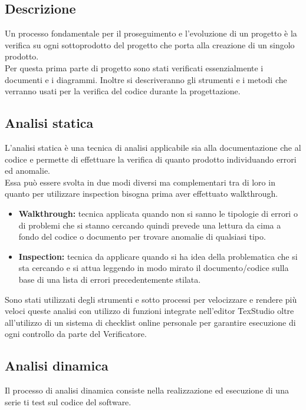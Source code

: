 \documentclass[NormeDiProgetto.tex]{subfiles}
\begin{document}
	\subsection{Descrizione}
	Un processo fondamentale per il proseguimento e l'evoluzione di un progetto è la verifica su ogni sottoprodotto del progetto che porta alla creazione di un singolo prodotto.\\
	Per questa prima parte di progetto sono stati verificati essenzialmente i documenti e i diagrammi. Inoltre si descriveranno gli strumenti e i metodi che verranno usati per la verifica del codice durante la progettazione.
	
	\subsection{Analisi statica}
	L'analisi statica è una tecnica di analisi applicabile sia alla documentazione che al codice e permette di effettuare la verifica di quanto prodotto individuando errori ed anomalie.\\
	Essa può essere svolta in due modi diversi ma complementari tra di loro in quanto per utilizzare inspection bisogna prima aver effettuato walkthrough.
		\begin{itemize}
			\item \textbf{Walkthrough:} tecnica applicata quando non si sanno le tipologie di errori o di problemi che si stanno cercando quindi prevede una lettura da cima a fondo del codice o documento per trovare anomalie di qualsiasi tipo.			
			\item \textbf{Inspection:} tecnica da applicare quando si ha idea della problematica che si sta cercando e si attua leggendo in modo mirato il documento/codice sulla base di una lista di errori precedentemente stilata.
		\end{itemize}
	Sono stati utilizzati degli strumenti e sotto processi per velocizzare e rendere più veloci queste analisi con utilizzo di funzioni integrate nell'editor TexStudio oltre all'utilizzo di un sistema di checklist online personale per garantire esecuzione di ogni controllo da parte del Verificatore.
	
	\subsection{Analisi dinamica}
	Il processo di analisi dinamica consiste nella realizzazione ed esecuzione di una serie ti test sul codice del software. 
	
\end{document}

